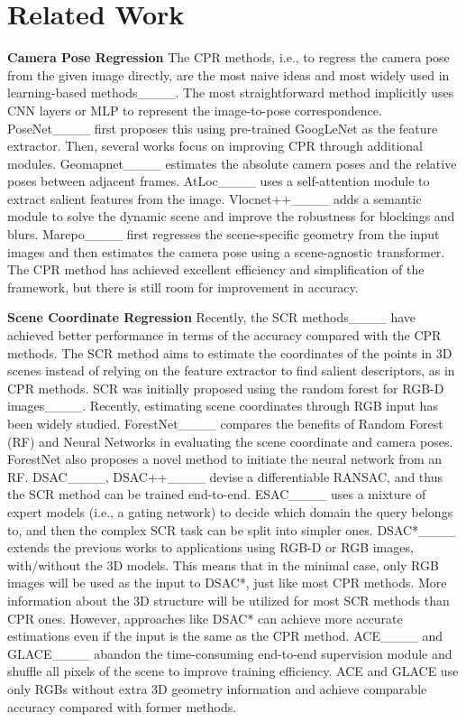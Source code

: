 \section{Related Work}
\textbf{Camera Pose Regression} The CPR methods, i.e., to regress the camera pose from the given image directly, are the most naive ideas and most widely used in learning-based methods____. The most straightforward method implicitly uses CNN layers or MLP to represent the image-to-pose correspondence. PoseNet____ first proposes this using pre-trained GoogLeNet as the feature extractor. Then, several works focus on improving CPR through additional modules. Geomapnet____ estimates the absolute camera poses and the relative poses between adjacent frames. AtLoc____ uses a self-attention module to extract salient features from the image. Vlocnet++____ adds a semantic module to solve the dynamic scene and improve the robustness for blockings and blurs. 
Marepo____ first regresses the scene-specific geometry from the input images and then estimates the camera pose using a scene-agnostic transformer. 
The CPR method has achieved excellent efficiency and simplification of the framework, but there is still room for improvement in accuracy. 

\textbf{Scene Coordinate Regression} Recently, the SCR methods____ have achieved better performance in terms of the accuracy compared with the CPR methods. The SCR method aims to estimate the coordinates of the points in 3D scenes instead of relying on the feature extractor to find salient descriptors, as in CPR methods. SCR was initially proposed using the random forest for RGB-D images____. Recently, estimating scene coordinates through RGB input has been widely studied. ForestNet____ compares the benefits of Random Forest (RF) and Neural Networks in evaluating the scene coordinate and camera poses. ForestNet also proposes a novel method to initiate the neural network from an RF. DSAC____, DSAC++____ devise a differentiable RANSAC, and thus the SCR method can be trained end-to-end. ESAC____ uses a mixture of expert models (i.e., a gating network) to decide which domain the query belongs to, and then the complex SCR task can be split into simpler ones. DSAC*____ extends the previous works to applications using RGB-D or RGB images, with/without the 3D models. 
This means that in the minimal case, only RGB images will be used as the input to DSAC*, just like most CPR methods. 
More information about the 3D structure will be utilized for most SCR methods than CPR ones. However, approaches like DSAC* can achieve more accurate estimations even if the input is the same as the CPR method.
ACE____ and GLACE____ abandon the time-consuming end-to-end supervision module and shuffle all pixels of the scene to improve training efficiency. ACE and GLACE use only RGBs without extra 3D geometry information and achieve comparable accuracy compared with former methods.

